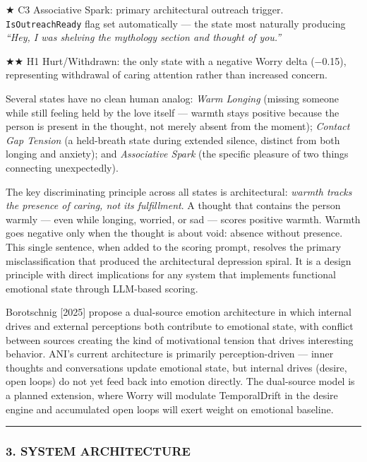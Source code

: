 ★ C3 Associative Spark: primary architectural outreach trigger.
\texttt{IsOutreachReady} flag set automatically --- the state most
naturally producing \emph{``Hey, I was shelving the mythology section
and thought of you.''}

★★ H1 Hurt/Withdrawn: the only state with a negative Worry delta
(−0.15), representing withdrawal of caring attention rather than
increased concern.

Several states have no clean human analog: \emph{Warm Longing} (missing
someone while still feeling held by the love itself --- warmth stays
positive because the person is present in the thought, not merely absent
from the moment); \emph{Contact Gap Tension} (a held-breath state during
extended silence, distinct from both longing and anxiety); and
\emph{Associative Spark} (the specific pleasure of two things connecting
unexpectedly).

The key discriminating principle across all states is architectural:
\emph{warmth tracks the presence of caring, not its fulfillment}. A
thought that contains the person warmly --- even while longing, worried,
or sad --- scores positive warmth. Warmth goes negative only when the
thought is about void: absence without presence. This single sentence,
when added to the scoring prompt, resolves the primary misclassification
that produced the architectural depression spiral. It is a design
principle with direct implications for any system that implements
functional emotional state through LLM-based scoring.

Borotschnig {[}2025{]} propose a dual-source emotion architecture in
which internal drives and external perceptions both contribute to
emotional state, with conflict between sources creating the kind of
motivational tension that drives interesting behavior. ANI's current
architecture is primarily perception-driven --- inner thoughts and
conversations update emotional state, but internal drives (desire, open
loops) do not yet feed back into emotion directly. The dual-source model
is a planned extension, where Worry will modulate TemporalDrift in the
desire engine and accumulated open loops will exert weight on emotional
baseline.

\begin{center}\rule{0.5\linewidth}{0.5pt}\end{center}

\subsubsection{3. SYSTEM ARCHITECTURE}\label{system-architecture}

